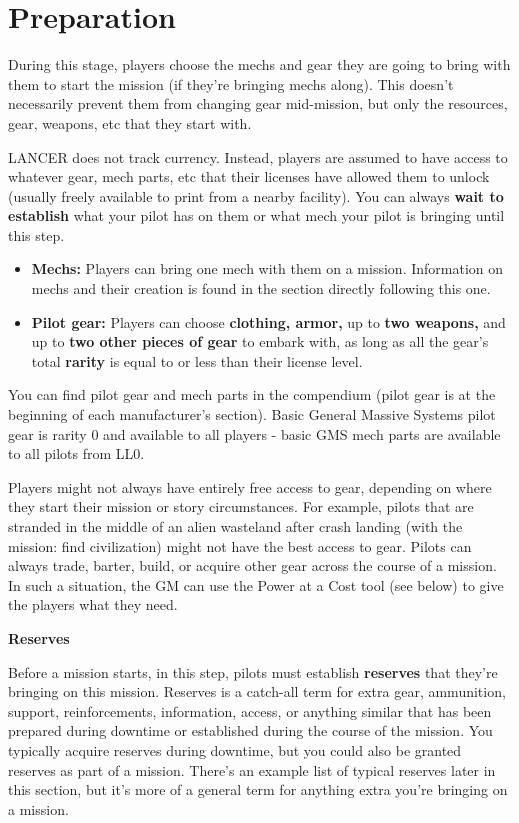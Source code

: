 \section{Preparation}

During this stage, players choose the mechs and gear they are going to bring with them to start the mission (if they’re bringing mechs along). This doesn’t necessarily prevent them from changing gear mid-mission, but only the resources, gear, weapons, etc that they start with.

LANCER does not track currency. Instead, players are assumed to have access to whatever gear, mech parts, etc that their licenses have allowed them to unlock (usually freely available to print from a nearby facility). You can always \textbf{wait to establish} what your pilot has on them or what mech your pilot is bringing until this step.

\begin{itemize}
\item \textbf{Mechs:} Players can bring one mech with them on a mission. Information on mechs and their creation is found in the section directly following this one.
\item \textbf{Pilot gear:} Players can choose \textbf{clothing, armor,} up to \textbf{two weapons,} and up to \textbf{two other pieces of gear} to embark with, as long as all the gear’s total \textbf{rarity} is equal to or less than their license level.
\end{itemize}  
You can find pilot gear and mech parts in the compendium (pilot gear is at the beginning of each manufacturer’s section). Basic General Massive Systems pilot gear is rarity 0 and available to all players - basic GMS mech parts are available to all pilots from LL0.

Players might not always have entirely free access to gear, depending on where they start their mission or story circumstances. For example, pilots that are stranded in the middle of an alien wasteland after crash landing (with the mission: find civilization) might not have the best access to gear. Pilots can always trade, barter, build, or acquire other gear across the course of a mission. In such a situation, the GM can use the Power at a Cost tool (see below) to give the
players what they need.

\begin{center}
\textbf{Reserves}
\end{center}

Before a mission starts, in this step, pilots must establish \textbf{reserves} that they’re bringing on this mission. Reserves is a catch-all term for extra gear, ammunition, support, reinforcements, information, access, or anything similar that has been prepared during downtime or established during the course of the mission. You typically acquire reserves during downtime, but you could also be granted reserves as part of a mission. There’s an example list of typical reserves later in this section, but it’s more of a general term for anything extra you’re bringing on a mission.
